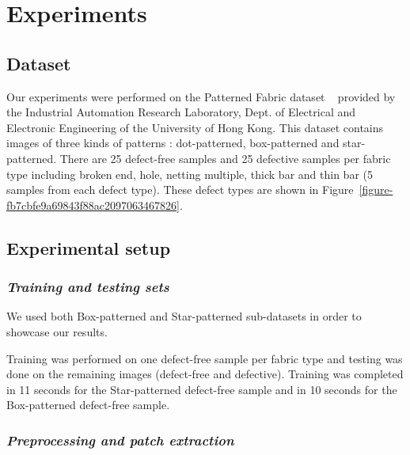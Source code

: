 \documentclass[3p,,preprint,review,12pt]{elsarticle}
\begin{document}
\section{Experiments}




\subsection{Dataset}
Our experiments were performed on the Patterned Fabric dataset \unskip~\cite{981091:21201209} provided by the Industrial Automation Research Laboratory, Dept. of Electrical and Electronic Engineering of the University of Hong Kong. This dataset contains images of three kinds of patterns : dot-patterned, box-patterned and star-patterned. There are 25 defect-free samples and 25 defective samples per fabric type including broken end, hole, netting multiple, thick bar and thin bar (5 samples from each defect type). These defect types are shown in Figure~\ref{figure-fb7cbfe9a69843f88ac2097063467826}.



\subsection{Experimental setup}



\subsubsection{\textit{Training and testing sets}}We used both Box-patterned and Star-patterned sub-datasets in order to showcase our results. 

Training was performed on one defect-free sample per fabric type and testing was done on the remaining images (defect-free and defective). Training was completed in 11 seconds for the Star-patterned defect-free sample and in 10 seconds for the Box-patterned defect-free sample.



\subsubsection{\textit{Preprocessing and patch extraction}}
\end{document}
